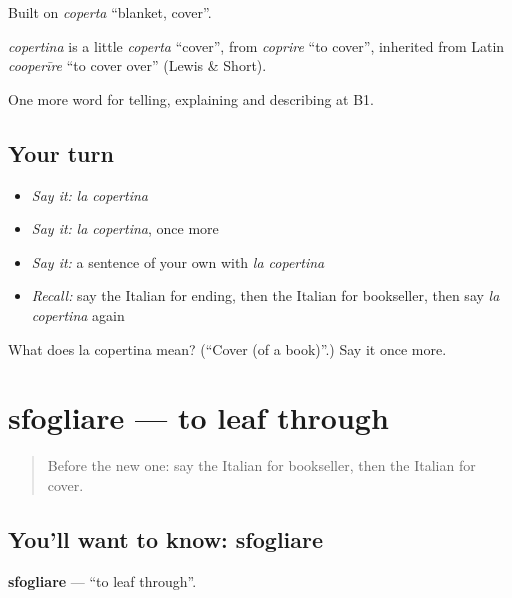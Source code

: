 Built on \emph{coperta} \textquotedblleft{}blanket, cover\textquotedblright{}.

\begin{cousinweb}
\emph{copertina} is a little \emph{coperta} \textquotedblleft{}cover\textquotedblright{}, from \emph{coprire} \textquotedblleft{}to cover\textquotedblright{}, inherited from Latin \emph{cooperīre} \textquotedblleft{}to cover over\textquotedblright{} (Lewis \& Short).
\end{cousinweb}

\begin{grammarlens}[title={What you've built}]
One more word for telling, explaining and describing at B1.
\end{grammarlens}

\subsection*{Your turn}
\begin{itemize}
\raggedright
  \item \emph{Say it:} \emph{la copertina}
  \item \emph{Say it:} \emph{la copertina}, once more
  \item \emph{Say it:} a sentence of your own with \emph{la copertina}
  \item \emph{Recall:} say the Italian for ending, then the Italian for bookseller, then say \emph{la copertina} again
\end{itemize}

\begin{tcolorbox}[breakable,colback=teal!4,colframe=teal!35!black,title={Before you move on}]
What does la copertina mean? (\textquotedblleft{}Cover (of a book)\textquotedblright{}.) Say it once more.
\end{tcolorbox}
\section[sfogliare]{sfogliare — to leaf through}

\label{lesson:IT-C525-sfogliare}



\begin{quote}
Before the new one: say the Italian for bookseller, then the Italian for cover.
\end{quote}

\subsection*{You'll want to know: sfogliare}
\textbf{sfogliare} — \textquotedblleft{}to leaf through\textquotedblright{}.

